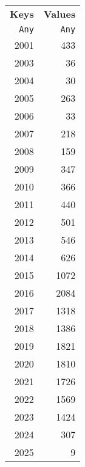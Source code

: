 \begin{tabular}{rr}
  \hline
  \textbf{Keys} & \textbf{Values} \\
  \texttt{Any} & \texttt{Any} \\\hline
  2001 & 433 \\
  2003 & 36 \\
  2004 & 30 \\
  2005 & 263 \\
  2006 & 33 \\
  2007 & 218 \\
  2008 & 159 \\
  2009 & 347 \\
  2010 & 366 \\
  2011 & 440 \\
  2012 & 501 \\
  2013 & 546 \\
  2014 & 626 \\
  2015 & 1072 \\
  2016 & 2084 \\
  2017 & 1318 \\
  2018 & 1386 \\
  2019 & 1821 \\
  2020 & 1810 \\
  2021 & 1726 \\
  2022 & 1569 \\
  2023 & 1424 \\
  2024 & 307 \\
  2025 & 9 \\\hline
\end{tabular}

